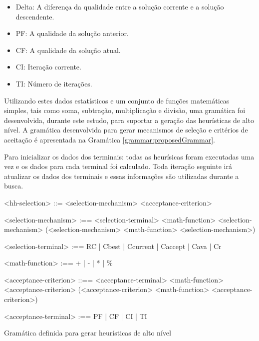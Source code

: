 \begin{itemize}
	\item Delta: A diferença da qualidade entre a solução corrente e a solução descendente.
	\item PF: A qualidade da solução anterior.
	\item CF: A qualidade da solução atual.
	\item CI: Iteração corrente.
	\item TI: Número de iterações.
\end{itemize}


Utilizando estes dados estatísticos e um conjunto de funções matemáticas simples, tais como soma, subtração, multiplicação e divisão, uma gramática foi desenvolvida, durante este estudo, para suportar a geração das heurísticas de alto nível. A gramática desenvolvida para gerar mecanismos de seleção e critérios de aceitação é apresentada na Gramática \ref{grammar:proposedGrammar}. 

Para inicializar os dados dos terminais: todas as heurísicas foram executadas uma vez e os dados para cada terminal foi calculado. Toda iteração seguinte irá atualizar os dados dos terminais e essas informações são utilizadas durante a busca.

 \begin{Grammar}
 	\begin{grammar}
 		<hh-selection> ::= <selection-mechanism> <acceptance-criterion> 
 		
 		<selection-mechanism> :==  <selection-terminal>   
 		\alt <selection-mechanism> <math-function> <selection-mechanism> 
 		\alt (<selection-mechanism> <math-function> <selection-mechanism>) 
 		
 		<selection-terminal> :== 
 		RC 
 		| Cbest 
 		| Ccurrent 
 		| Caccept 
 		| Cava 
 		| Cr
 		
 		<math-function> :== + 
 		| - 
 		| * 
 		| \%
 		
 		<acceptance-criterion> ::== <acceptance-terminal> 
 		\alt <acceptance-criterion> <math-function>
 		<acceptance-criterion>
 		\alt (<acceptance-criterion>  <math-function> <acceptance-criterion>) 
 		
 		<acceptance-terminal> :== PF | CF | CI | TI
 		
 		
 		
 	\end{grammar}
 	\caption{Gramática definida para gerar  heurísticas de alto nível}
 	\label{grammar:proposedGrammar}
 \end{Grammar}
 
